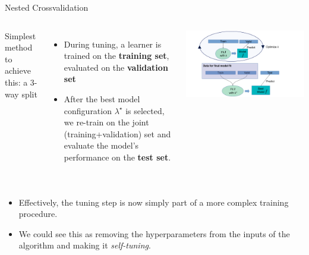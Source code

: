 \begin{frame}{Nested Crossvalidation}
\framebreak

\vspace{1cm}
\begin{columns}[c, onlytextwidth]
\hspace*{-0.3cm}
Simplest method to achieve this: a 3-way split
\begin{itemize}
\item During tuning, a learner is trained on the \textbf{training set},
  evaluated on the  \textbf{validation set}
\item After the best model configuration $\lambda^\star$ is selected, we re-train on the joint (training+validation) set and evaluate the model's performance on the \textbf{test set}.
\end{itemize}

\hspace*{-0.7cm}
\begin{center}
\includegraphics[width=1.2\textwidth]{images/train_valid_test.pdf}
\end{center}
\end{columns}
\framebreak


\vspace{1cm}
\begin{columns}[c, onlytextwidth]
\hspace*{-0.3cm}
\begin{itemize}
\item Effectively, the tuning step is now simply part of a more complex training procedure.
\item We could see this as removing the hyperparameters from the inputs of the algorithm and making it \textit{self-tuning}.
\end{itemize}


\end{columns}
\end{frame}
